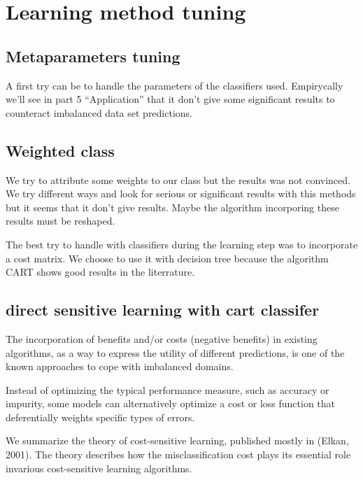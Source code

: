 \documentclass[
]{report}
\begin{document}
\hypertarget{learning-method-tuning}{%
\section{Learning method tuning}\label{learning-method-tuning}}

\hypertarget{metaparameters-tuning}{%
\subsection{Metaparameters tuning}\label{metaparameters-tuning}}

A first try can be to handle the parameters of the classifiers used. Empirycally we'll see in part 5 ``Application'' that it don't give some significant results to counteract imbalanced data set predictions.

\hypertarget{weighted-class}{%
\subsection{Weighted class}\label{weighted-class}}

We try to attribute some weights to our class but the results was not convinced. We try different ways and look for serious or significant results with this methods but it seems that it don't give results. Maybe the algorithm incorporing these results must be reshaped.

The best try to handle with classifiers during the learning step was to incorporate a cost matrix. We choose to use it with decision tree because the algorithm CART shows good results in the literrature.\citep{MK}

\hypertarget{direct-sensitive-learning-with-cart-classifer}{%
\subsection{direct sensitive learning with cart classifer}\label{direct-sensitive-learning-with-cart-classifer}}

The incorporation of beneﬁts and/or costs (negative beneﬁts) in existing algorithms, as a way to express the utility of diﬀerent predictions, is one of the known approaches to cope with imbalanced domains.

Instead of optimizing the typical performance measure, such as accuracy or impurity, some models can alternatively optimize a cost or loss function that deferentially weights speciﬁc types of errors.

We summarize the theory of cost-sensitive learning, published mostly in (Elkan, 2001). The theory describes how the misclassification cost plays its essential role invarious cost-sensitive learning algorithms.
\end{document}
